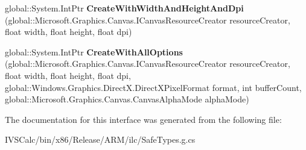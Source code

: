 \begin{DoxyCompactItemize}
\item 
\mbox{\label{interface_microsoft_1_1_graphics_1_1_canvas_1_1_i_canvas_swap_chain_factory_abec837948f196cc09791ba957885b690}} 
global\+::\+System.\+Int\+Ptr {\bfseries Create\+With\+Width\+And\+Height\+And\+Dpi} (global\+::\+Microsoft.\+Graphics.\+Canvas.\+I\+Canvas\+Resource\+Creator resource\+Creator, float width, float height, float dpi)
\item 
\mbox{\label{interface_microsoft_1_1_graphics_1_1_canvas_1_1_i_canvas_swap_chain_factory_ab3ef9c019b3b37be03ba50236075ba58}} 
global\+::\+System.\+Int\+Ptr {\bfseries Create\+With\+All\+Options} (global\+::\+Microsoft.\+Graphics.\+Canvas.\+I\+Canvas\+Resource\+Creator resource\+Creator, float width, float height, float dpi, global\+::\+Windows.\+Graphics.\+Direct\+X.\+Direct\+X\+Pixel\+Format format, int buffer\+Count, global\+::\+Microsoft.\+Graphics.\+Canvas.\+Canvas\+Alpha\+Mode alpha\+Mode)
\end{DoxyCompactItemize}


The documentation for this interface was generated from the following file\+:\begin{DoxyCompactItemize}
\item 
I\+V\+S\+Calc/bin/x86/\+Release/\+A\+R\+M/ilc/Safe\+Types.\+g.\+cs\end{DoxyCompactItemize}
